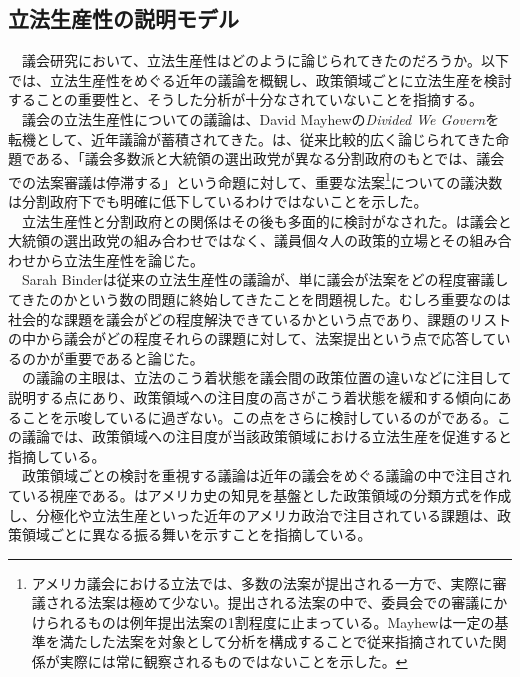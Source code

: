 \documentclass[here]{article}
\begin{document}
\subsection{立法生産性の説明モデル}
　議会研究において、立法生産性はどのように論じられてきたのだろうか。以下では、立法生産性をめぐる近年の議論を概観し、政策領域ごとに立法生産を検討することの重要性と、そうした分析が十分なされていないことを指摘する。\\
　議会の立法生産性についての議論は、David Mayhewの\textit{Divided We Govern}を転機として、近年議論が蓄積されてきた。\citet*{Mayhew1991-rq}は、従来比較的広く論じられてきた命題である、「議会多数派と大統領の選出政党が異なる分割政府のもとでは、議会での法案審議は停滞する」という命題に対して、重要な法案\footnote{アメリカ議会における立法では、多数の法案が提出される一方で、実際に審議される法案は極めて少ない。提出される法案の中で、委員会での審議にかけられるものは例年提出法案の1割程度に止まっている。Mayhewは一定の基準を満たした法案を対象として分析を構成することで従来指摘されていた関係が実際には常に観察されるものではないことを示した。}についての議決数は分割政府下でも明確に低下しているわけではないことを示した。\\
　立法生産性と分割政府との関係はその後も多面的に検討がなされた。\citet*{Krehbiel1998-ob,Krehbiel2010-ob}は議会と大統領の選出政党の組み合わせではなく、議員個々人の政策的立場とその組み合わせから立法生産性を論じた。\\
　Sarah Binderは従来の立法生産性の議論が、単に議会が法案をどの程度審議してきたのかという数の問題に終始してきたことを問題視した。むしろ重要なのは社会的な課題を議会がどの程度解決できているかという点であり、課題のリストの中から議会がどの程度それらの課題に対して、法案提出という点で応答しているのかが重要であると論じた。\citep*{Binder2003-bn,Binder2017-wr}\\
　\citet*{Binder2003-bn}の議論の主眼は、立法のこう着状態を議会間の政策位置の違いなどに注目して説明する点にあり、政策領域への注目度の高さがこう着状態を緩和する傾向にあることを示唆しているに過ぎない。この点をさらに検討しているのが\citet*{Adler2013-ay}である。この議論では、政策領域への注目度が当該政策領域における立法生産を促進すると指摘している。\\
　政策領域ごとの検討を重視する議論は近年の議会をめぐる議論の中で注目されている視座である。\citet*{Lapinski2008-lr,Lapinski2013-jl}はアメリカ史の知見を基盤とした政策領域の分類方式を作成し、分極化や立法生産といった近年のアメリカ政治で注目されている課題は、政策領域ごとに異なる振る舞いを示すことを指摘している。\\
\end{document}
